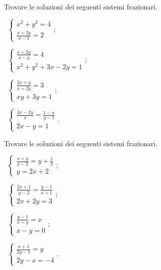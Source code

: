 \begin{esercizio}[\Ast]
 \label{ese:6.10}
Trovare le soluzioni dei seguenti sistemi frazionari.
\begin{multicols}{2}
 \begin{enumeratea}
 \item~$\left\{\begin{array}{l}x^2+y^2=4\\\frac{x+2y}{x-1}=2\end{array}\right.$;
 \item~$\left\{\begin{array}{l}\frac{x+2y}{x-y}=4\\x^2+y^2+3x-2y=1\end{array}\right.$;
 \item~$\left\{\begin{array}{l}\frac{2x+y}{x+2y}=3\\xy+3y=1\end{array}\right.$;
 \item~$\left\{\begin{array}{l}\frac{3x-2y} x=\frac{1-x}{y-1}\\2x-y=1\end{array}\right.$.
 \end{enumeratea}
 \end{multicols}
\end{esercizio}

\begin{esercizio}[\Ast]
 \label{ese:6.11}
Trovare le soluzioni dei seguenti sistemi frazionari.
\begin{multicols}{2}
 \begin{enumeratea}
 \item~$\left\{\begin{array}{l}\frac{x+y}{x-2}=y+\frac 1 3\\y=2x+2\end{array}\right.$;
 \item~$\left\{\begin{array}{l}\frac{2x+1}{y-2}=\frac{y-1}{x+1}\\2x+2y=3\end{array}\right.$;
 \item~$\left\{\begin{array}{l}\frac{y-1}{x+y}=x\\x-y=0\end{array}\right.$;
 \item~$\left\{\begin{array}{l}\frac{x+1}{2y-1}=y\\2y-x=-4\end{array}\right.$.
 \end{enumeratea}
 \end{multicols}
\end{esercizio}

